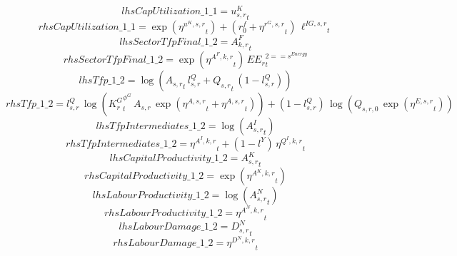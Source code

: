 \begin{dmath*}
lhsCapUtilization\_1\_1 = {{u^K_{s,r}}}_{t}
\end{dmath*}
\begin{dmath*}
rhsCapUtilization\_1\_1 = \exp\left({{\eta^{u^K,s,r}}}_{t}\right)+\left({{r^f_0}}+{{\eta^{r^G,s,r}}}_{t}\right)\, {{\ell^{IG,s,r}}}_{t}
\end{dmath*}
\begin{dmath*}
lhsSectorTfpFinal\_1\_2 = {{A^{F}_{k,r}}}_{t}
\end{dmath*}
\begin{dmath*}
rhsSectorTfpFinal\_1\_2 = \exp\left({{\eta^{A^F,k,r}}}_{t}\right)\, {{EE_r}}_{t}^{2=={{s^{Energy}}}}
\end{dmath*}
\begin{dmath*}
lhsTfp\_1\_2 = \log\left({{A_{s,r}}}_{t}\, {{l^{Q}_{s,r}}}+{{Q_{s,r}}}_{t}\, \left(1-{{l^{Q}_{s,r}}}\right)\right)
\end{dmath*}
\begin{dmath*}
rhsTfp\_1\_2 = {{l^{Q}_{s,r}}}\, \log\left({{K^G_{r}}}_{t}^{{{\phi^{G}}}}\, {{A_{s,r}}}\, \exp\left({{\eta^{A,s,r}}}_{t}+{{\eta^{A,s,r}}}_{t}\right)\right)+\left(1-{{l^{Q}_{s,r}}}\right)\, \log\left({{Q_{s,r,0}}}\, \exp\left({{\eta^{E,s,r}}}_{t}\right)\right)
\end{dmath*}
\begin{dmath*}
lhsTfpIntermediates\_1\_2 = \log\left({{A^{I}_{s,r}}}_{t}\right)
\end{dmath*}
\begin{dmath*}
rhsTfpIntermediates\_1\_2 = {{\eta^{A^{I},k,r}}}_{t}+\left(1-{{l^{Y}}}\right)\, {{\eta^{Q^{I},k,r}}}_{t}
\end{dmath*}
\begin{dmath*}
lhsCapitalProductivity\_1\_2 = {{A^{K}_{s,r}}}_{t}
\end{dmath*}
\begin{dmath*}
rhsCapitalProductivity\_1\_2 = \exp\left({{\eta^{A^{K},k,r}}}_{t}\right)
\end{dmath*}
\begin{dmath*}
lhsLabourProductivity\_1\_2 = \log\left({{A^{N}_{s,r}}}_{t}\right)
\end{dmath*}
\begin{dmath*}
rhsLabourProductivity\_1\_2 = {{\eta^{A^{N},k,r}}}_{t}
\end{dmath*}
\begin{dmath*}
lhsLabourDamage\_1\_2 = {{D^N_{s,r}}}_{t}
\end{dmath*}
\begin{dmath*}
rhsLabourDamage\_1\_2 = {{\eta^{D^{N},k,r}}}_{t}
\end{dmath*}
